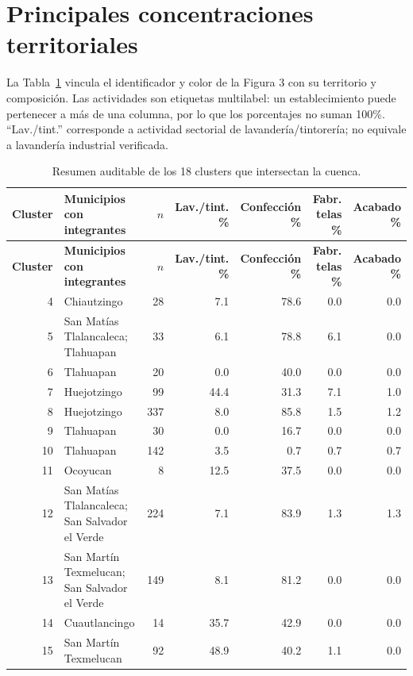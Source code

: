 \documentclass[11pt,letterpaper]{article}
\begin{document}
\section{Principales concentraciones territoriales}

La Tabla~\ref{tab:clusters-resumen} vincula el identificador y color de la Figura 3 con su territorio y composición. Las actividades son etiquetas multilabel: un establecimiento puede pertenecer a más de una columna, por lo que los porcentajes no suman 100\%. ``Lav./tint.'' corresponde a actividad sectorial de lavandería/tintorería; no equivale a lavandería industrial verificada.

\begin{landscape}
\footnotesize
\begin{longtable}{r p{6.0cm} r r r r r}
\caption{Resumen auditable de los 18 clusters que intersectan la cuenca.}\label{tab:clusters-resumen}\\
\toprule
\textbf{Cluster} & \textbf{Municipios con integrantes} & \textbf{$n$} & \textbf{Lav./tint. \%} & \textbf{Confección \%} & \textbf{Fabr. telas \%} & \textbf{Acabado \%} \\
\midrule
\endfirsthead
\toprule
\textbf{Cluster} & \textbf{Municipios con integrantes} & \textbf{$n$} & \textbf{Lav./tint. \%} & \textbf{Confección \%} & \textbf{Fabr. telas \%} & \textbf{Acabado \%} \\
\midrule
\endhead
4 & Chiautzingo & 28 & 7.1 & 78.6 & 0.0 & 0.0 \\
5 & San Matías Tlalancaleca; Tlahuapan & 33 & 6.1 & 78.8 & 6.1 & 0.0 \\
6 & Tlahuapan & 20 & 0.0 & 40.0 & 0.0 & 0.0 \\
7 & Huejotzingo & 99 & 44.4 & 31.3 & 7.1 & 1.0 \\
8 & Huejotzingo & 337 & 8.0 & 85.8 & 1.5 & 1.2 \\
9 & Tlahuapan & 30 & 0.0 & 16.7 & 0.0 & 0.0 \\
10 & Tlahuapan & 142 & 3.5 & 0.7 & 0.7 & 0.7 \\
11 & Ocoyucan & 8 & 12.5 & 37.5 & 0.0 & 0.0 \\
12 & San Matías Tlalancaleca; San Salvador el Verde & 224 & 7.1 & 83.9 & 1.3 & 1.3 \\
13 & San Martín Texmelucan; San Salvador el Verde & 149 & 8.1 & 81.2 & 0.0 & 0.0 \\
14 & Cuautlancingo & 14 & 35.7 & 42.9 & 0.0 & 0.0 \\
15 & San Martín Texmelucan & 92 & 48.9 & 40.2 & 1.1 & 0.0 \\

\end{longtable}
\end{landscape}
\end{document}
